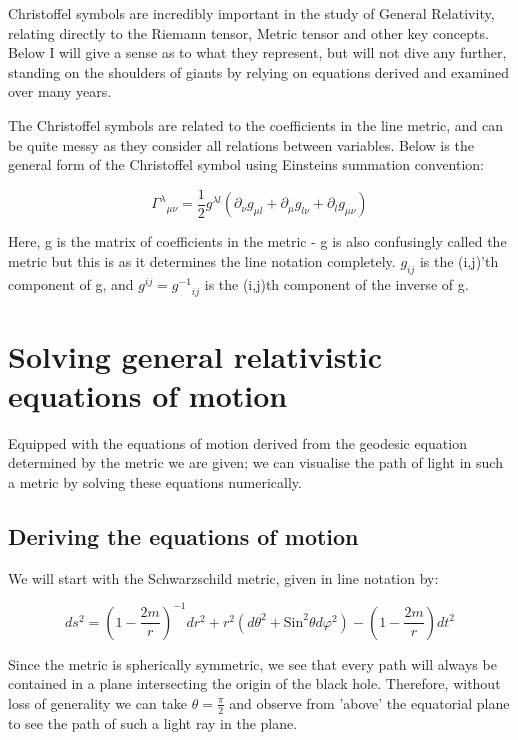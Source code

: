 \documentclass[oneside,openright,frontopenright]{dmathesis}
\begin{document}
	Christoffel symbols are incredibly important in the study of General Relativity, relating directly to the Riemann tensor, Metric tensor and other key concepts. Below I will give a sense as to what they represent, but will not dive any further, standing on the shoulders of giants by relying on equations derived and examined over many years.

	The Christoffel symbols are related to the coefficients in the line metric, and can be quite messy as they consider all relations between variables. Below is the general form of the Christoffel symbol using Einsteins summation convention\cite{albert1916foundation}:
	
	\[{\Gamma^\lambda}_{\mu\nu} = \frac{1}{2}g^{\lambda{l}}(\partial_{\nu}g_{\mu{l}} + \partial_{\mu}g_{l\nu} + \partial_{l}g_{\mu\nu})\]
	
	Here, g is the matrix of coefficients in the metric - g is also confusingly called the metric but this is as it determines the line notation completely. $g_{ij}$ is the (i,j)'th component of g, and $g^{ij} = {g^{-1}}_{ij}$ is the (i,j)th component of the inverse of g.

\chapter{Solving general relativistic equations of motion}

	Equipped with the equations of motion derived from the geodesic equation determined by the metric we are given; we can visualise the path of light in such a metric by solving these equations numerically.


\section{Deriving the equations of motion}
	
	We will start with the Schwarzschild metric, given in line notation by\cite{derivationSchwarzschild}: 


	\[{ds^{2} = {\left(1-\frac {2m}{r}\right)}^{-1}} {dr^2} + {r^2}({d\theta ^2} + {\mbox{Sin} ^2}{\theta}{d\varphi ^2}) -{\left(1-\frac {2m}{r}\right)}{dt^2}\]


	Since the metric is spherically symmetric, we see that every path will always be contained in a plane intersecting the origin of the black hole. Therefore, without loss of generality we can take ${\theta}=\frac{\pi}{2}$ and observe from 'above’ the equatorial plane to see the path of such a light ray in the plane.
\end{document}
